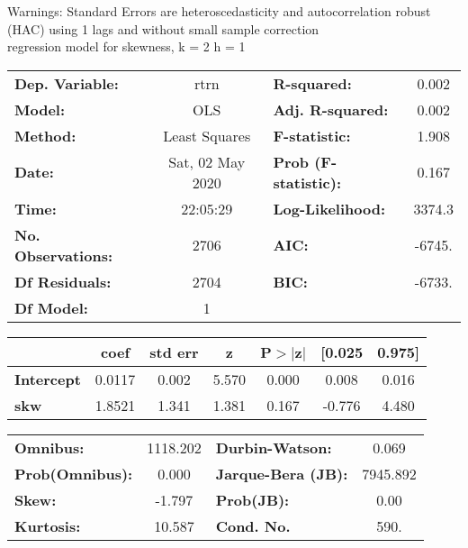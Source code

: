 Warnings: \newline
 [1] Standard Errors are heteroscedasticity and autocorrelation robust (HAC) using 1 lags and without small sample correction\\ 

regression model for skewness, k = 2 h = 1\begin{center}
\begin{tabular}{lclc}
\toprule
\textbf{Dep. Variable:}    &       rtrn       & \textbf{  R-squared:         } &     0.002   \\
\textbf{Model:}            &       OLS        & \textbf{  Adj. R-squared:    } &     0.002   \\
\textbf{Method:}           &  Least Squares   & \textbf{  F-statistic:       } &     1.908   \\
\textbf{Date:}             & Sat, 02 May 2020 & \textbf{  Prob (F-statistic):} &    0.167    \\
\textbf{Time:}             &     22:05:29     & \textbf{  Log-Likelihood:    } &    3374.3   \\
\textbf{No. Observations:} &        2706      & \textbf{  AIC:               } &    -6745.   \\
\textbf{Df Residuals:}     &        2704      & \textbf{  BIC:               } &    -6733.   \\
\textbf{Df Model:}         &           1      & \textbf{                     } &             \\
\bottomrule
\end{tabular}
\begin{tabular}{lcccccc}
                   & \textbf{coef} & \textbf{std err} & \textbf{z} & \textbf{P$> |$z$|$} & \textbf{[0.025} & \textbf{0.975]}  \\
\midrule
\textbf{Intercept} &       0.0117  &        0.002     &     5.570  &         0.000        &        0.008    &        0.016     \\
\textbf{skw}       &       1.8521  &        1.341     &     1.381  &         0.167        &       -0.776    &        4.480     \\
\bottomrule
\end{tabular}
\begin{tabular}{lclc}
\textbf{Omnibus:}       & 1118.202 & \textbf{  Durbin-Watson:     } &    0.069  \\
\textbf{Prob(Omnibus):} &   0.000  & \textbf{  Jarque-Bera (JB):  } & 7945.892  \\
\textbf{Skew:}          &  -1.797  & \textbf{  Prob(JB):          } &     0.00  \\
\textbf{Kurtosis:}      &  10.587  & \textbf{  Cond. No.          } &     590.  \\
\bottomrule
\end{tabular}
\end{center}

